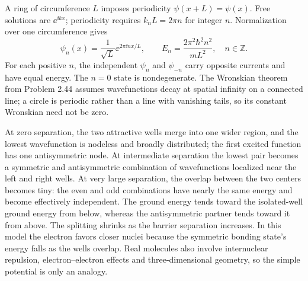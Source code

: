 A ring of circumference $L$ imposes periodicity
$\psi(x+L)=\psi(x)$. Free solutions are
$\ee^{\ii kx}$; periodicity requires
$k_nL=2\pi n$ for integer $n$.
Normalization over one circumference gives
\begin{equation}
\boxed{\psi_n(x)=\frac1{\sqrt L}\ee^{2\pi\ii nx/L}},
\qquad
\boxed{E_n=\frac{2\pi^2\hbar^2n^2}{mL^2}},
\quad n\in\mathbb Z.
\end{equation}
For each positive $n$, the independent
$\psi_n$ and $\psi_{-n}$ carry opposite currents
and have equal energy. The $n=0$ state is
nondegenerate. The Wronskian theorem from
Problem 2.44 assumes wavefunctions decay
at spatial infinity on a connected line;
a circle is periodic rather than a line
with vanishing tails, so its constant
Wronskian need not be zero.

At zero separation, the two attractive wells merge
into one wider region, and the lowest wavefunction
is nodeless and broadly distributed; the first excited
function has one antisymmetric node. At intermediate
separation the lowest pair becomes a symmetric and
antisymmetric combination of wavefunctions localized
near the left and right wells. At very large separation,
the overlap between the two centers becomes tiny:
the even and odd combinations have nearly the
same energy and become effectively independent.
The ground energy tends toward the isolated-well
ground energy from below, whereas the antisymmetric
partner tends toward it from above.
The splitting shrinks as the barrier separation
increases. In this model the electron favors closer
nuclei because the symmetric bonding state's
energy falls as the wells overlap. Real molecules
also involve internuclear repulsion, electron--electron
effects and three-dimensional geometry, so the
simple potential is only an analogy.

